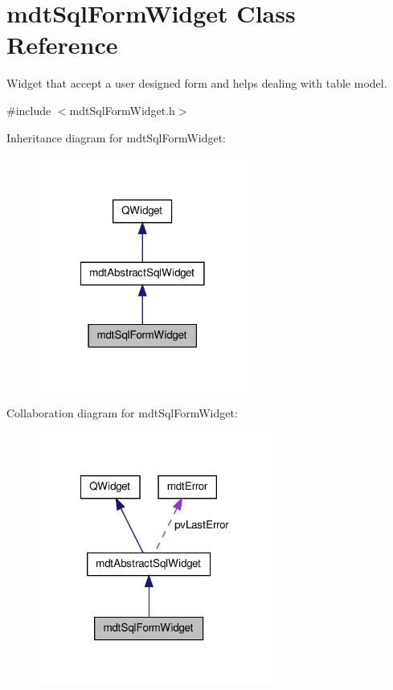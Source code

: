 \hypertarget{classmdt_sql_form_widget}{\section{mdt\-Sql\-Form\-Widget Class Reference}
\label{classmdt_sql_form_widget}
}


Widget that accept a user designed form and helps dealing with table model.  




{\ttfamily \#include $<$mdt\-Sql\-Form\-Widget.\-h$>$}



Inheritance diagram for mdt\-Sql\-Form\-Widget\-:\nopagebreak
\begin{figure}[H]
\begin{center}
\leavevmode
\includegraphics[width=194pt]{classmdt_sql_form_widget__inherit__graph}
\end{center}
\end{figure}


Collaboration diagram for mdt\-Sql\-Form\-Widget\-:
\nopagebreak
\begin{figure}[H]
\begin{center}
\leavevmode
\includegraphics[width=218pt]{classmdt_sql_form_widget__coll__graph}
\end{center}
\end{figure}
